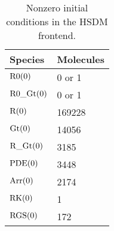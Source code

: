 \documentclass[a4paper, 12pt]{book}
\begin{document}
\begin{table}[H]
\centering
\caption{Nonzero initial conditions in the HSDM frontend.}
\begin{tabular}{l | l}
Species & Molecules \\
\hline
\hline
${\rm R0}(0)$ & 0 or 1\\
\hline
${\rm R0}\_{\rm Gt}(0)$ & 0 or 1\\
\hline
${\rm R}(0)$ & 169228\\
\hline
${\rm Gt}(0)$ & 14056\\
\hline
${\rm R}\_{\rm Gt}(0)$ & 3185\\
\hline
${\rm PDE}(0)$ & 3448 \\
\hline
${\rm Arr}(0)$ & 2174\\
\hline
${\rm RK}(0)$ & 1\\
\hline
${\rm RGS}(0)$ & 172\\
\hline
\end{tabular}
\end{table}
\end{document}
